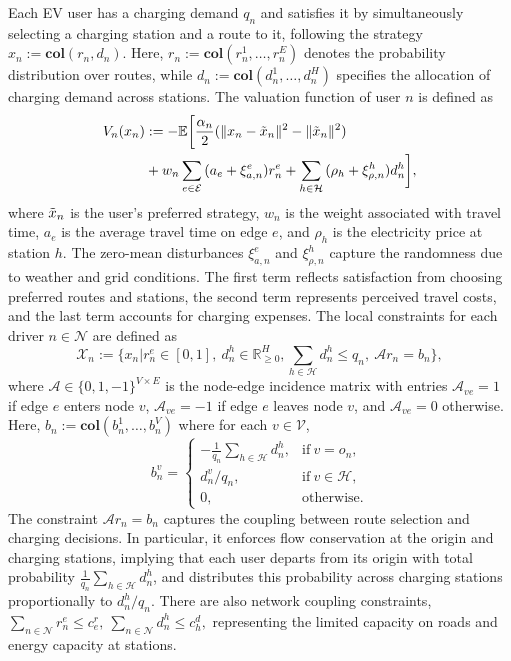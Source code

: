 \documentclass[twocolumn]{autart}
\begin{document}
Each EV user has a charging demand $q_n$ and satisfies it by simultaneously selecting a charging station and a route to it, following the strategy $x_n:=\textbf{col}(r_n,d_n)$. Here, $r_n:=\textbf{col}(r_n^1,\ldots,r_n^E)$ denotes the probability distribution over routes, while $d_n:=\textbf{col}(d_n^1,\ldots,d_n^H)$ specifies the allocation of charging demand across stations. The valuation function of user $n$ is defined as
\begin{equation*}
\begin{aligned}
\begin{split}
    V_n(x_n) &:= -\mathbb{E}\bigg[\frac{\alpha_n}{2}(\|x_n-\Tilde{x}_n\|^2-\|\tilde{x}_n\|^2)\\&+w_n\sum_{e\in\mathcal{E}}{(a_e+\xi_{a,n}^e)r_n^e}+\sum_{h\in\mathcal{H}}{(\rho_h+\xi_{\rho,n}^h)d_n^h}\bigg],
\end{split}
\end{aligned}
\end{equation*}
where $\Tilde{x}_n$ is the user’s preferred strategy, $w_n$ is the weight associated with travel time, $a_e$ is the average travel time on edge $e$, and $\rho_h$ is the electricity price at station $h$. The zero-mean disturbances $\xi_{a,n}^e$ and $\xi_{\rho,n}^h$ capture the randomness due to weather and grid conditions. The first term reflects satisfaction from choosing preferred routes and stations, the second term represents perceived travel costs, and the last term accounts for charging expenses.
The local constraints for each driver $n\in\mathcal{N}$ are defined as
\begin{equation*}
    \mathcal{X}_n:=\{x_n|r_n^e\in [0,1], \ d_n^h\in \mathbb{R}_{\geq 0}^H, \sum_{h\in\mathcal{H}}{d_n^h}\leq q_n, \ \mathcal{A}r_n=b_n\},
\end{equation*} 
where $\mathcal{A}\in \{0,1,-1\}^{V\times E}$ is the node-edge incidence matrix with entries $\mathcal{A}_{ve}=1$ if edge $e$ enters node $v$, $\mathcal{A}_{ve}=-1$ if edge $e$ leaves node $v$, and $\mathcal{A}_{ve}=0$ otherwise.
Here, $b_n:=\textbf{col}(b_n^1, \ldots, b_n^V)$ where for each $v\in\mathcal{V}$,
\begin{equation*}
    b_n^v=\begin{cases}
    -\frac{1}{q_n}\sum_{h\in\mathcal{H}}{d_n^h},&\text{if}\ v=o_n,\\
    d_n^v/q_n,&\text{if}\ v\in \mathcal{H},\\
    0,& \text{otherwise}.
\end{cases} 
\end{equation*} 
The constraint $\mathcal{A}r_n=b_n$ captures the coupling between route selection and charging decisions. In particular, it enforces flow conservation at the origin and charging stations, implying that each user departs from its origin with total probability $\frac{1}{q_n}\sum_{h\in\mathcal{H}}{d_n^h}$, and distributes this probability across charging stations proportionally to $d_n^h/q_n$. There are also network coupling constraints, 
$       \sum_{n\in\mathcal{N}}{r_n^e} \leq c_e^r, \
        \sum_{n\in\mathcal{N}}{d_n^h} \leq c_h^d,
$
representing the limited capacity on roads and energy capacity at stations. 
\end{document}

